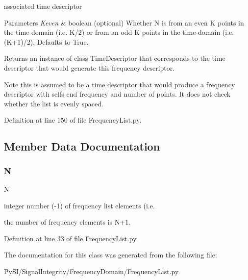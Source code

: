 associated time descriptor 


\begin{DoxyParams}{Parameters}
{\em Keven} & boolean (optional) Whether N is from an even K points in the time domain (i.\+e. K/2) or from an odd K points in the time-\/domain (i.\+e. (K+1)/2). Defaults to True. \\
\hline
\end{DoxyParams}
\begin{DoxyReturn}{Returns}
an instance of class Time\+Descriptor that corresponds to the time descriptor that would generate this frequency descriptor. 
\end{DoxyReturn}
\begin{DoxyNote}{Note}
this is assumed to be a time descriptor that would produce a frequency descriptor with self\textquotesingle{}s end frequency and number of points. It does not check whether the list is evenly spaced. 
\end{DoxyNote}


Definition at line 150 of file Frequency\+List.\+py.



\subsection{Member Data Documentation}
\mbox{\label{classSignalIntegrity_1_1FrequencyDomain_1_1FrequencyList_1_1FrequencyList_a8cc2e7240164328fdc3f0e5e21032c56}} 
\subsubsection{\texorpdfstring{N}{N}}
{\footnotesize\ttfamily N}



integer number (-\/1) of frequency list elements (i.\+e. 

the number of frequency elements is N+1. 

Definition at line 33 of file Frequency\+List.\+py.



The documentation for this class was generated from the following file\+:\begin{DoxyCompactItemize}
\item 
Py\+S\+I/\+Signal\+Integrity/\+Frequency\+Domain/Frequency\+List.\+py\end{DoxyCompactItemize}
